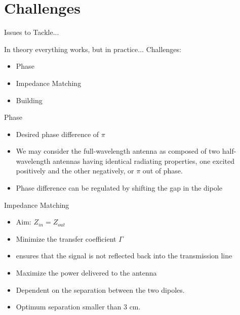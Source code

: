 \documentclass{beamer}
\begin{document}
\section{Challenges}
\begin{frame}{Issues to Tackle...}
\begin{block}{In theory everything works, but in practice...}
Challenges:
\begin{itemize}
\item Phase
\item Impedance Matching
\item Building
\end{itemize}
\end{block}

\end{frame}
\begin{frame}{Phase}
\begin{itemize}
\item	Desired phase difference of $\pi$
\item We may consider the full-wavelength antenna as composed of two
half-wavelength antennas having identical radiating properties, one excited positively and the other negatively, or $\pi$ out of phase. 
\item 	Phase difference can be regulated by shifting the gap in the dipole 
\end{itemize} 
\end{frame}


\begin{frame}{Impedance Matching}
\begin{block}{}
\begin{itemize}
\item Aim: $Z_{in}=Z_{out}$
\item Minimize the transfer coefficient $\Gamma$
\item ensures that the signal is not reflected back into the transmission line
 \cite{foldeddipolebasics}
\item Maximize the power delivered to the antenna
 \end{itemize}
\end{block}
\begin{itemize}
\item Dependent on the separation between the two dipoles. 
\item Optimum separation smaller than 3 cm. 
\end{itemize}

\end{frame}
\end{document}
